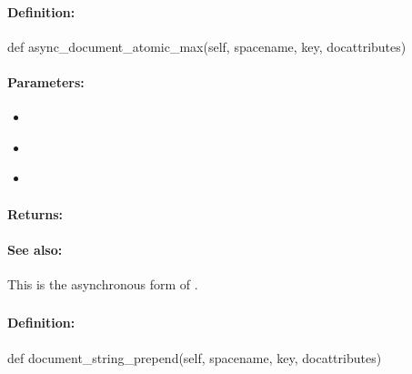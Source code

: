 \paragraph{Definition:}
\begin{pythoncode}
def async_document_atomic_max(self, spacename, key, docattributes)
\end{pythoncode}

\paragraph{Parameters:}
\begin{itemize}[noitemsep]
\item {}\\

\item {}\\

\item {}\\

\end{itemize}

\paragraph{Returns:}


\paragraph{See also:}  This is the asynchronous form of .

\pagebreak
\subsubsection{}
\label{api:python:document_string_prepend}


\paragraph{Definition:}
\begin{pythoncode}
def document_string_prepend(self, spacename, key, docattributes)
\end{pythoncode}


